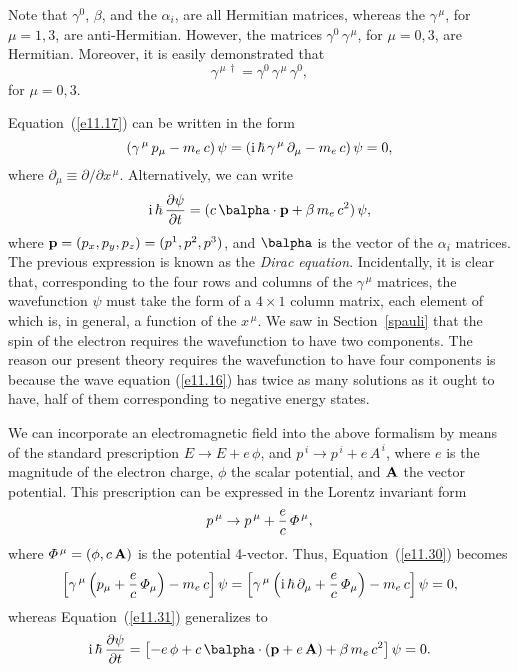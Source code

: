 Note that  $\gamma^0$, $\beta$, and the $\alpha_i$, are all Hermitian matrices, whereas the $\gamma^{\,\mu}$, for $\mu=1,3$, are anti-Hermitian. 
However, the matrices $\gamma^0\,\gamma^{\,\mu}$, for $\mu=0,3$, are Hermitian. Moreover, it is easily demonstrated that
\begin{equation}\label{e11.30x}
\gamma^{\,\mu\,\dag} = \gamma^0\,\gamma^{\,\mu}\,\gamma^0,
\end{equation}
for $\mu=0,3$. 

Equation~(\ref{e11.17}) can be written in the form
\begin{equation}\label{e11.30}
(\gamma^{\,\mu}\,p_\mu - m_e\,c)\,\psi = ({\rm i}\,\hbar\,\gamma^{\,\mu}\,\partial_\mu-m_e\,c)\,\psi=0,
\end{equation}
where $\partial_\mu\equiv \partial/\partial x^{\,\mu}$.  Alternatively, we can write 
\begin{equation}\label{e11.31}
{\rm i}\,\hbar\,\frac{\partial\psi}{\partial t} = (c\,\balpha\cdot{\bf p} + \beta\,m_e\,c^2)\,\psi,
\end{equation}
where ${\bf p}=(p_x,p_y,p_z)=(p^1,p^2,p^3)$, and $\balpha$ is the vector of the $\alpha_i$ matrices. The previous expression is known as the {\em Dirac equation}. 
Incidentally, it is clear that, corresponding to the four rows and columns of the $\gamma^{\,\mu}$ matrices, the wavefunction $\psi$
must take the form of a $4\times 1$ column matrix, each element of which is, in general, a function of the $x^{\,\mu}$. 
We saw in Section~\ref{spauli} that the spin of the electron requires the wavefunction to have two components. The reason
our present theory requires the wavefunction to have four components is because the wave equation (\ref{e11.16}) has twice
as many solutions as it ought to have, half of them corresponding to negative energy states. 

We can incorporate an electromagnetic field into the above formalism by means of the standard prescription $E\rightarrow E+e\,\phi$, and
$p^{\,i}\rightarrow p^{\,i} +e\,A^{\,i}$, where $e$ is the magnitude of the electron charge, $\phi$ the scalar potential, and ${\bf A}$ the
vector potential. This prescription can be expressed in the Lorentz invariant form
\begin{equation}
p^{\,\mu} \rightarrow p^{\,\mu} + \frac{e}{c}\,{\mit\Phi}^{\,\mu},
\end{equation}
where ${\mit\Phi}^{\,\mu} = (\phi,c\,{\bf A})$ is the potential 4-vector. Thus,
Equation~(\ref{e11.30}) becomes
\begin{equation}\label{e11.33}
\left[\gamma^{\,\mu}\left(p_\mu+\frac{e}{c}\,{\mit\Phi}_\mu\right)-m_e\,c\right]\psi = \left[\gamma^{\,\mu}\left({\rm i}\,\hbar\,\partial_\mu+\frac{e}{c}\,{\mit\Phi}_\mu\right)-m_e\,c\right]\psi=0 ,
\end{equation}
whereas
Equation~(\ref{e11.31}) generalizes to 
\begin{equation}\label{e11.34}
{\rm i}\,\hbar\,\frac{\partial\psi}{\partial t} =\left[-e\,\phi + c\,\balpha\cdot({\bf p}+e\,{\bf A})+ \beta\,m_e\,c^2\right]\psi = 0.
\end{equation}

